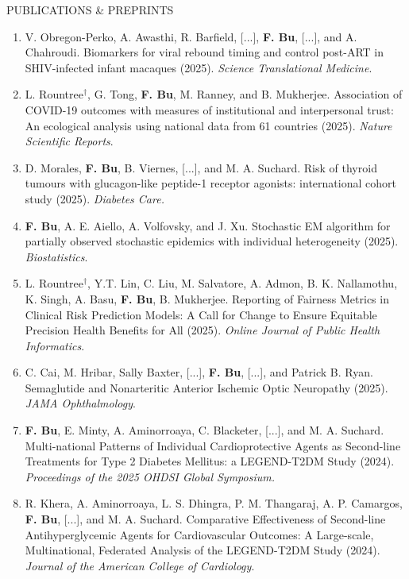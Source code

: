 \documentclass{resume} %
\newcommand{\myName}[1]{\textbf{#1}}
\begin{document}
\begin{rSection}{PUBLICATIONS \& PREPRINTS}
\begin{enumerate}[{label=\arabic*\addtocounter{enumi}{-2}., itemsep=3pt, parsep=0pt, topsep=3pt, start=\value{pubtotal}, leftmargin=0pt}]
	\item V. Obregon-Perko, A. Awasthi, R. Barfield, [...], \myName{F. Bu}, [...], and A. Chahroudi. Biomarkers for viral rebound timing and control post-ART in SHIV-infected infant macaques (2025). \emph{Science Translational Medicine}. 
	
	\item L. Rountree$^\dagger$, G. Tong, \myName{F. Bu}, M. Ranney, and B. Mukherjee. Association of COVID-19 outcomes with measures of institutional and interpersonal trust: An ecological analysis using national data from 61 countries (2025). \emph{Nature Scientific Reports}.   
	
	\item 
	D. Morales, \myName{F. Bu}, B. Viernes, [...], and M. A. Suchard. Risk of thyroid tumours with glucagon-like peptide-1 receptor agonists: international cohort study (2025). \emph{Diabetes Care.} 
	
	\item \myName{F. Bu}, A. E. Aiello, A. Volfovsky, and J. Xu.  
	Stochastic EM algorithm for partially observed stochastic epidemics with individual heterogeneity (2025).  \emph{Biostatistics}.%
	
	\item 
	L. Rountree$^\dagger$, Y.T.  Lin, C. Liu, M. Salvatore, A.  Admon, B. K. Nallamothu, K. Singh, A. Basu, \myName{F. Bu}, B. Mukherjee. Reporting of Fairness Metrics in Clinical Risk Prediction Models: A Call for Change to Ensure Equitable Precision Health Benefits for All (2025). \emph{Online Journal of Public Health Informatics}.
	
	\item 
	C. Cai, M. Hribar, Sally Baxter, [...],  \myName{F. Bu}, [...], and Patrick B. Ryan. 
	Semaglutide and Nonarteritic Anterior Ischemic Optic Neuropathy (2025). \emph{JAMA Ophthalmology}.  
	
	\item \myName{F. Bu}, E. Minty, A. Aminorroaya, C. Blacketer, [...], and M. A. Suchard. 
	Multi-national Patterns of Individual Cardioprotective Agents as Second-line Treatments for Type 2 Diabetes Mellitus: a LEGEND-T2DM Study (2024). \emph{Proceedings of the 2025 OHDSI Global Symposium.}
	
	\item 
	R. Khera, A. Aminorroaya, L. S. Dhingra, P. M.  Thangaraj, A. P. Camargos, \myName{F. Bu}, [...], and M. A. Suchard. Comparative Effectiveness of Second-line Antihyperglycemic Agents for Cardiovascular Outcomes: A Large-scale, Multinational, Federated Analysis of the LEGEND-T2DM Study (2024). \emph{Journal of the American College of Cardiology}. 
	

\end{enumerate}
\end{rSection}
\end{document}
